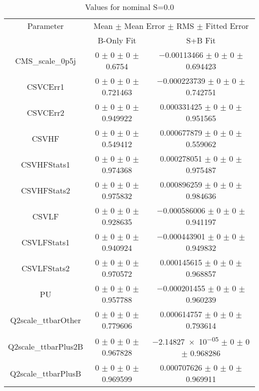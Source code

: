 \begin{table}
\centering
\caption{Values for nominal S=0.0}
\begin{tabular}{ccc}
\toprule
Parameter & \multicolumn{2}{c}{Mean $\pm$ Mean Error $\pm$ RMS $\pm$ Fitted Error}\\
 & B-Only Fit & S+B Fit\\
\midrule
CMS\_scale\_0p5j & \num{0} $\pm$ \num{0} $\pm$ \num{0} $\pm$ \num{0.6754} & \num{-0.00113466} $\pm$ \num{0} $\pm$ \num{0} $\pm$ \num{0.694423}\\
CSVCErr1 & \num{0} $\pm$ \num{0} $\pm$ \num{0} $\pm$ \num{0.721463} & \num{-0.000223739} $\pm$ \num{0} $\pm$ \num{0} $\pm$ \num{0.742751}\\
CSVCErr2 & \num{0} $\pm$ \num{0} $\pm$ \num{0} $\pm$ \num{0.949922} & \num{0.000331425} $\pm$ \num{0} $\pm$ \num{0} $\pm$ \num{0.951565}\\
CSVHF & \num{0} $\pm$ \num{0} $\pm$ \num{0} $\pm$ \num{0.549412} & \num{0.000677879} $\pm$ \num{0} $\pm$ \num{0} $\pm$ \num{0.559062}\\
CSVHFStats1 & \num{0} $\pm$ \num{0} $\pm$ \num{0} $\pm$ \num{0.974368} & \num{0.000278051} $\pm$ \num{0} $\pm$ \num{0} $\pm$ \num{0.975487}\\
CSVHFStats2 & \num{0} $\pm$ \num{0} $\pm$ \num{0} $\pm$ \num{0.975832} & \num{0.000896259} $\pm$ \num{0} $\pm$ \num{0} $\pm$ \num{0.984636}\\
CSVLF & \num{0} $\pm$ \num{0} $\pm$ \num{0} $\pm$ \num{0.928635} & \num{-0.000586006} $\pm$ \num{0} $\pm$ \num{0} $\pm$ \num{0.941197}\\
CSVLFStats1 & \num{0} $\pm$ \num{0} $\pm$ \num{0} $\pm$ \num{0.940924} & \num{-0.000443901} $\pm$ \num{0} $\pm$ \num{0} $\pm$ \num{0.949832}\\
CSVLFStats2 & \num{0} $\pm$ \num{0} $\pm$ \num{0} $\pm$ \num{0.970572} & \num{0.000145615} $\pm$ \num{0} $\pm$ \num{0} $\pm$ \num{0.968857}\\
PU & \num{0} $\pm$ \num{0} $\pm$ \num{0} $\pm$ \num{0.957788} & \num{-0.000201455} $\pm$ \num{0} $\pm$ \num{0} $\pm$ \num{0.960239}\\
Q2scale\_ttbarOther & \num{0} $\pm$ \num{0} $\pm$ \num{0} $\pm$ \num{0.779606} & \num{0.000614757} $\pm$ \num{0} $\pm$ \num{0} $\pm$ \num{0.793614}\\
Q2scale\_ttbarPlus2B & \num{0} $\pm$ \num{0} $\pm$ \num{0} $\pm$ \num{0.967828} & \num{-2.14827e-05} $\pm$ \num{0} $\pm$ \num{0} $\pm$ \num{0.968286}\\
Q2scale\_ttbarPlusB & \num{0} $\pm$ \num{0} $\pm$ \num{0} $\pm$ \num{0.969599} & \num{0.000707626} $\pm$ \num{0} $\pm$ \num{0} $\pm$ \num{0.969911}\\

\end{tabular}
\end{table}

